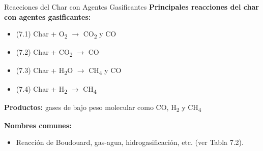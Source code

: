 \documentclass[../../main.tex]{subfiles}
\begin{document}
\begin{frame}{Reacciones del Char con Agentes Gasificantes}
\small
\textbf{Principales reacciones del char con agentes gasificantes:}
\vspace{0.5em}
\begin{itemize}
  \item (7.1) Char + O\textsubscript{2} $\rightarrow$ CO\textsubscript{2} y CO
  \item (7.2) Char + CO\textsubscript{2} $\rightarrow$ CO
  \item (7.3) Char + H\textsubscript{2}O $\rightarrow$ CH\textsubscript{4} y CO
  \item (7.4) Char + H\textsubscript{2} $\rightarrow$ CH\textsubscript{4}
\end{itemize}

\vspace{0.5em}
\textbf{Productos:} gases de bajo peso molecular como CO, H\textsubscript{2} y CH\textsubscript{4}

\vspace{0.5em}
\textbf{Nombres comunes:}
\begin{itemize}
  \item Reacción de Boudouard, gas-agua, hidrogasificación, etc. (ver Tabla 7.2).
\end{itemize}
\end{frame}
\end{document}
